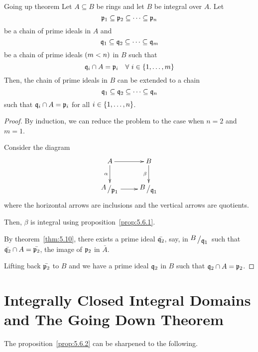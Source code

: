 \begin{theorem}{Going up theorem}{}
\label{thm:5.11}
	Let \(A \subseteq B\) be rings and let \(B\) be integral over \(A\).
	Let
	\[
		\mathfrak{p}_1 \subseteq \mathfrak{p}_2 \subseteq \cdots \subseteq \mathfrak{p}_n
	\]
	be a chain of prime ideals in \(A\) and
	\[
		\mathfrak{q}_1 \subseteq \mathfrak{q}_2 \subseteq \cdots \subseteq \mathfrak{q}_m
	\]
	be a chain of prime ideals \(\left( m < n \right)\) in \(B\) such that
	\[
		\mathfrak{q}_i \cap A = \mathfrak{p}_i \quad \forall\ i \in \left\{ 1, \ldots, m \right\}
	\]
	Then, the chain of prime ideals in \(B\) can be extended to a chain
	\[
		\mathfrak{q}_1 \subseteq \mathfrak{q}_2 \subseteq \cdots \subseteq \mathfrak{q}_n
	\]
	such that \(\mathfrak{q}_i \cap A = \mathfrak{p}_i\)
	for all \(i \in \left\{ 1, \ldots, n \right\}\).
\end{theorem}
\begin{proof}
	By induction, we can reduce the problem to the case
	when \(n = 2\) and \(m = 1\).

	Consider the diagram
	\begin{align*}
		\xymatrix{
			A \ar[d]_-{\alpha} \ar[r]^-{} & B \ar[d]_-{\beta} \\
			\bigslant{A}{\mfp_1} \ar[r]_-{} & \bigslant{B}{\mfq_1}
		}
	\end{align*}
	where the horizontal arrows are inclusions and the vertical arrows
	are quotients.

	Then, \(\beta\) is integral using proposition~\ref{prop:5.6.1}.

	By theorem~\ref{thm:5.10}, there exists a prime ideal \(\bar{\mathfrak{q}_2}\),
	say, in \(\bigslant{B}{\mfq_1}\) such that \(\bar{\mathfrak{q}_2} \cap A
	= \bar{\mathfrak{p}_2}\), the image of \(\mathfrak{p}_2\) in \(\bar{A}\).

	Lifting back \(\bar{\mathfrak{p}_2}\) to \(B\) and we have a prime ideal
	\(\mathfrak{q}_2\) in \(B\) such that \(\mathfrak{q}_2 \cap A = \mathfrak{p}_2\).
\end{proof}


\pagebreak


\section{Integrally Closed Integral Domains and The Going Down Theorem}

The proposition~\ref{prop:5.6.2} can be sharpened to the following.

